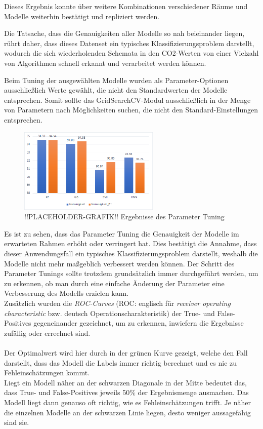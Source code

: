 Dieses Ergebnis konnte über weitere Kombinationen verschiedener Räume und Modelle weiterhin
bestätigt und repliziert werden. 

\newpage
Die Tatsache, dass die Genauigkeiten aller Modelle so nah beieinander 
liegen, rührt daher, dass dieses Datenset ein typisches Klassifizierungsproblem darstellt,
wodurch die sich wiederholenden Schemata in den CO2-Werten von einer Vielzahl von Algorithmen schnell 
erkannt und verarbeitet werden können.

Beim Tuning der ausgewählten Modelle wurden als Parameter-Optionen ausschließlich Werte gewählt, die nicht 
den Standardwerten der Modelle entsprechen. Somit sollte das GridSearchCV-Modul ausschließlich in der Menge 
von Parametern nach Möglichkeiten suchen, die nicht den Standard-Einstellungen entsprechen.

\begin{figure}[h]
    \centering
    \includegraphics[width=0.6\textwidth]{pic/param_eval.png}
    \caption{!!PLACEHOLDER-GRAFIK!! Ergebnisse des Parameter Tuning}
    \label{fig:PT_eval}
\end{figure}

Es ist zu sehen, dass das Parameter Tuning die Genauigkeit der Modelle im erwarteten Rahmen erhöht oder 
verringert hat. Dies bestätigt die Annahme, dass dieser Anwendungsfall ein typisches Klassifizierungsproblem 
darstellt, weshalb die Modelle nicht mehr maßgeblich verbessert werden können. Der Schritt des Parameter Tunings 
sollte trotzdem grundsätzlich immer durchgeführt werden, um zu erkennen, ob man durch eine einfache Änderung 
der Parameter eine Verbesserung des Modells erzielen kann.\\

\newpage
Zusätzlich wurden die \textit{ROC-Curves} (ROC: englisch für \textit{receiver operating characteristic} bzw. 
deutsch Operationscharakteristik)
der True- und False-Positives gegeneinander gezeichnet, um zu erkennen, 
inwiefern die Ergebnisse zufällig oder errechnet sind.\\\\
Der Optimalwert wird hier durch in der grünen Kurve gezeigt, welche den Fall darstellt, 
dass das Modell die Labels immer richtig berechnet und es nie zu Fehleinschätzungen kommt.\\
Liegt ein Modell näher an der schwarzen Diagonale in der Mitte bedeutet das, dass True- und 
False-Positives jeweils 50\% der Ergebnismenge ausmachen. 
Das Modell liegt dann genauso oft richtig, wie es Fehleinschätzungen trifft. 
Je näher die einzelnen Modelle an der schwarzen Linie liegen, desto weniger aussagefähig sind sie. 

